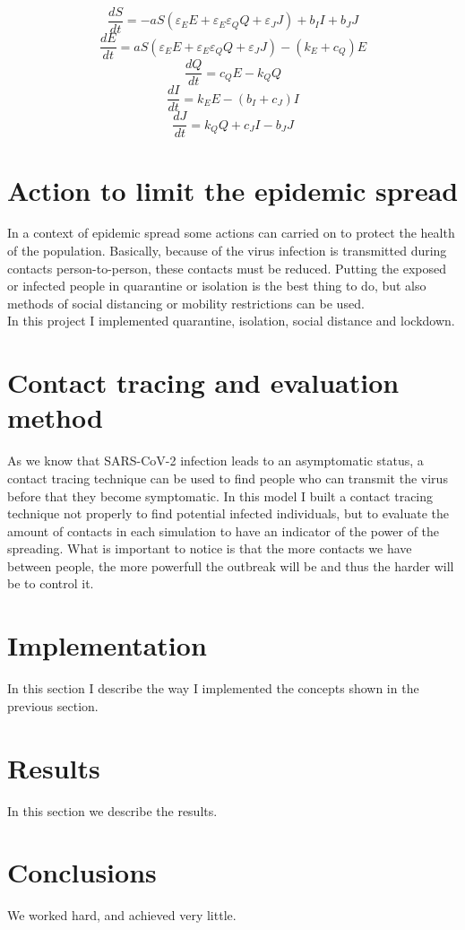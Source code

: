 \documentclass[12pt]{llncs}
\begin{document}
$$\frac{dS}{dt} = -aS(\varepsilon_EE + \varepsilon_E\varepsilon_QQ + \varepsilon_JJ) + b_II + b_JJ$$
$$\frac{dE}{dt} = aS(\varepsilon_EE + \varepsilon_E\varepsilon_QQ + \varepsilon_JJ) - (k_E + c_Q)E$$
$$\frac{dQ}{dt} = c_QE - k_QQ$$
$$\frac{dI}{dt} = k_EE - (b_I + c_J)I$$
$$\frac{dJ}{dt} = k_QQ + c_JI - b_JJ$$

\section{Action to limit the epidemic spread}
In a context of epidemic spread some actions can carried on to protect the health of the population. Basically, because of the virus infection is transmitted during contacts person-to-person, these contacts must be reduced. Putting the exposed or infected people in quarantine or isolation is the best thing to do, but also methods of social distancing or mobility restrictions can be used. \\
In this project I implemented quarantine, isolation, social distance and lockdown.

\section{Contact tracing and evaluation method}
As we know that SARS-CoV-2 infection leads to an asymptomatic status, a contact tracing technique can be used to find people who can transmit the virus before that they become symptomatic. In this model I built a contact tracing technique not properly to find potential infected individuals, but to evaluate the amount of contacts in each simulation to have an indicator of the power of the spreading. What is important to notice is that the more contacts we have between people, the more powerfull the outbreak will be and thus the harder will be to control it.

\section{Implementation}
In this section I describe the way I implemented the concepts shown in the previous section.

\section{Results}\label{results}
In this section we describe the results.

\section{Conclusions}\label{conclusions}
We worked hard, and achieved very little.

\printbibliography[title={References}]
\end{document}
